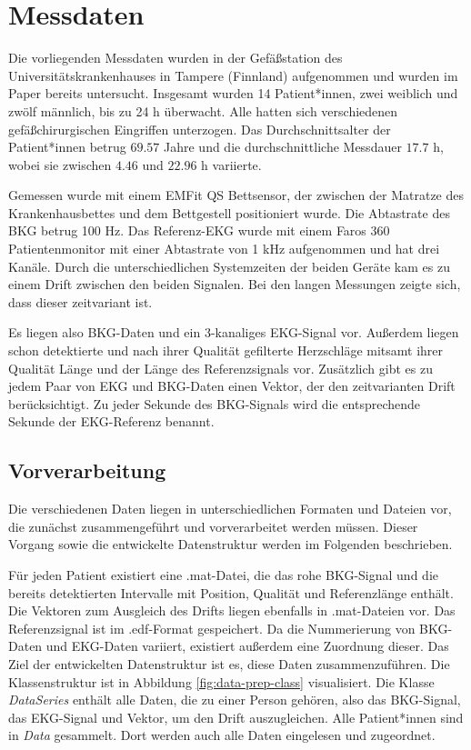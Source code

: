 \section{Messdaten}

	Die vorliegenden Messdaten wurden in der Gefäßstation des Universitätskrankenhauses in Tampere (Finnland) aufgenommen und wurden im Paper  bereits untersucht. Insgesamt wurden 14 Patient*innen, zwei weiblich und zwölf männlich, bis zu 24 h überwacht. Alle hatten sich verschiedenen gefäßchirurgischen Eingriffen unterzogen. Das Durchschnittsalter der Patient*innen betrug $69.57$ Jahre und die durchschnittliche Messdauer $17.7$ h, wobei sie zwischen $4.46$ und $22.96$ h variierte.
	
	Gemessen wurde mit einem EMFit QS Bettsensor, der zwischen der Matratze des Krankenhausbettes und dem Bettgestell positioniert wurde. Die Abtastrate des \ac{BKG} betrug 100 Hz. Das Referenz-\ac{EKG} wurde mit einem Faros 360 Patientenmonitor mit einer Abtastrate von 1 kHz aufgenommen und hat drei Kanäle. Durch die unterschiedlichen Systemzeiten der beiden Geräte kam es zu einem Drift zwischen den beiden Signalen. Bei den langen Messungen zeigte sich, dass dieser zeitvariant ist.
	
	Es liegen also \ac{BKG}-Daten und ein 3-kanaliges \ac{EKG}-Signal vor. Außerdem liegen schon detektierte und nach ihrer Qualität gefilterte Herzschläge mitsamt ihrer Qualität Länge und der Länge des Referenzsignals vor. Zusätzlich gibt es zu jedem Paar von \ac{EKG} und \ac{BKG}-Daten einen Vektor, der den zeitvarianten Drift berücksichtigt. Zu jeder Sekunde des \ac{BKG}-Signals wird die entsprechende Sekunde der \ac{EKG}-Referenz benannt.
	
	\subsection{Vorverarbeitung}
	
	Die verschiedenen Daten liegen in unterschiedlichen Formaten und Dateien vor, die zunächst zusammengeführt und vorverarbeitet werden müssen. Dieser Vorgang sowie die entwickelte Datenstruktur werden im Folgenden beschrieben.
	
	Für jeden Patient existiert eine .mat-Datei, die das rohe \ac{BKG}-Signal und die bereits detektierten Intervalle mit Position, Qualität und Referenzlänge enthält. Die Vektoren zum Ausgleich des Drifts liegen ebenfalls in .mat-Dateien vor. Das Referenzsignal ist im .edf-Format gespeichert. Da die Nummerierung von \ac{BKG}-Daten und \ac{EKG}-Daten variiert, existiert außerdem eine Zuordnung dieser. Das Ziel der entwickelten Datenstruktur ist es, diese Daten zusammenzuführen. Die Klassenstruktur ist in Abbildung \ref{fig:data-prep-class} visualisiert. Die Klasse \textit{DataSeries} enthält alle Daten, die zu einer Person gehören, also das \ac{BKG}-Signal, das \ac{EKG}-Signal und Vektor, um den Drift auszugleichen. Alle Patient*innen sind in \textit{Data} gesammelt. Dort werden auch alle Daten eingelesen und zugeordnet.
	
